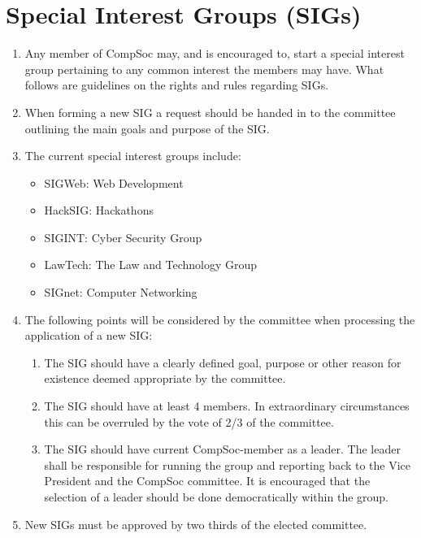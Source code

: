 \section{Special Interest Groups (SIGs)}

\begin{enumerate}

\item Any member of CompSoc may, and is encouraged to, start a special interest group pertaining to any common interest the members may have. What follows are guidelines on the rights and rules regarding SIGs.

\item When forming a new SIG a request should be handed in to the committee outlining the main goals and purpose of the SIG\@.

\item The current special interest groups include:
  \begin{itemize}
  \item SIGWeb: Web Development
  \item HackSIG\@: Hackathons
  \item SIGINT\@: Cyber Security Group
  \item LawTech: The Law and Technology Group
  \item SIGnet: Computer Networking
  \end{itemize}

\item The following points will be considered by the committee when processing the application of a new SIG\@:
  \begin{enumerate}
  \item The SIG should have a clearly defined goal, purpose or other reason for existence deemed appropriate by the committee.
  \item The SIG should have at least 4 members. In extraordinary circumstances this can be overruled by the vote of 2/3 of the committee.
  \item The SIG should have current CompSoc-member as a leader. The leader shall be responsible for running the group and reporting back to the Vice President and the CompSoc committee. It is encouraged that the selection of a leader should be done democratically within the group.
  \end{enumerate}

\item New SIGs must be approved by two thirds of the elected committee.


\end{enumerate}
